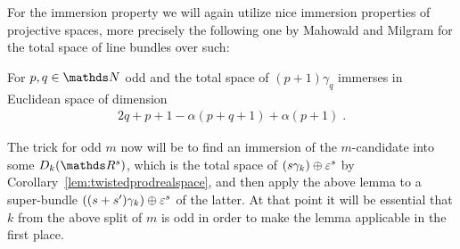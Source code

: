 For the immersion property we will again utilize nice immersion
properties of projective spaces, more precisely the following one by
Mahowald and Milgram for the total space of line bundles over such:
\begin{Lem}
  \label{lem:immersionuniversalbdl}
  For $p,q\in\Nat$ odd and the total space of $(p+1)\gamma_q$ immerses
  in Euclidean space of dimension
  \begin{gather*}
    2q+p+1-\alpha(p+q+1)+\alpha(p+1)
    \;.
  \end{gather*}
\end{Lem}
The trick for odd $m$ now will be to find an immersion of the
$m$-candidate into some $\Twistedprod{k}{\R^{s}}$, which is
the total space of $(s\gamma_k)\oplus\varepsilon^s$
by Corollary~\ref{lem:twistedprodrealspace}, and then apply the above
lemma to a super-bundle $((s+s')\gamma_k)\oplus\varepsilon^s$ of
the latter.
At that point it will be essential that $k$ from the above split of
$m$ is odd in order to make the lemma applicable in the first
place.

